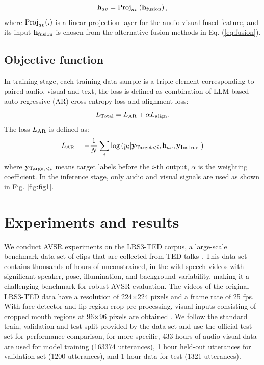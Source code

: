 \documentclass[conference]{IEEEtran}
\begin{document}
\begin{equation}
	{\bf h}_{av}  = {\rm Proj}_{av} \left( {{\bf h}_{\rm fusion} } \right),  
\end{equation}
where ${\rm Proj}_{av}(.)$ is a linear projection layer for the audio-visual fused feature, and its input ${\bf h}_{\rm fusion}$ is chosen from the alternative fusion methods in Eq. (\ref{eq:fusion}).
\subsection{Objective function}
In training stage, each training data sample is a triple element corresponding to paired audio, visual and text, the loss is defined as combination of LLM based auto-regressive (AR) cross entropy loss and alignment loss:
\begin{equation}
	L_{\rm Total}  = L_{\rm AR}  + \alpha L_{\rm align}.
	\label{eq:TotalLoss}
\end{equation}
The loss $L_{\rm AR}$ is defined as:
\begin{equation}
	L_{\rm AR}  =  - \frac{1}{N}\sum\limits_i {\log \left( {y_i |{\bf y}_{{\rm Target} < i} ,{\bf h}_{av} ,{\bf y}_{{\rm Instruct}} } \right)}  
\end{equation}
where ${\bf y}_{{\rm Target} < i}$ means target labels before the $i$-th output, $\alpha$ is the weighting coefficient. In the inference stage, only audio and visual signals are used as shown in Fig. \ref{fig:fig1}. 

\section{Experiments and results}
\label{sect:experiments}
We conduct AVSR experiments on the LRS3-TED corpus, a large-scale benchmark data set of clips that are collected from TED talks \cite{LRS3}. This data set contains thousands of hours of unconstrained, in-the-wild speech videos with significant speaker, pose, illumination, and background variability, making it a challenging benchmark for robust AVSR evaluation. The videos of the original LRS3-TED data have a resolution of 224$\times$224 pixels and a frame rate of 25 fps. With face detector and lip region crop pre-processing, visual inputs consisting of cropped mouth regions at 96$\times$96 pixels are obtained \cite{MaICASSP2021, MaICASSP2023}. We follow the standard train, validation and test split provided by the data set and use the official test set for performance comparison, for more specific, 433 hours of audio-visual data are used for model training (163374 utterances), 1 hour held-out utterances for validation set (1200 utterances), and 1 hour data for test (1321 utterances). 
\end{document}
